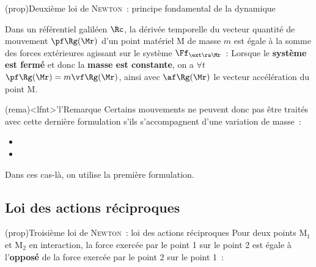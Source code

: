 \documentclass[../../main/main.tex]{subfiles}
\begin{document}
\begin{tcb*}(prop){Deuxième loi de \textsc{Newton}~: principe fondamental de la
			dynamique}

	Dans un référentiel galiléen $\Rc$, la dérivée temporelle du vecteur
	quantité de mouvement $\pf\Rg(\Mr)$ d'un point matériel M de masse $m$ est
	égale à la somme des forces extérieures agissant sur le système
	$\Ff_{\ext\ra\Mr}$~:
	\psw{
		\[
			\boxed{\dv{\pf\Rg(\Mr)}{t} = \sum \Ff_{\ext\ra\Mr}}
		\]
	}
	Lorsque le \textbf{système est fermé} et donc la \textbf{masse est constante},
	on a $\forall t$ $\pf\Rg(\Mr) = m\vf\Rg(\Mr)$, ainsi
	\psw{
		\[
			\boxed{m\af\Rg(\Mr) = \sum \Ff_{\ext\ra\Mr}}
		\]
	}
	avec $\af\Rg(\Mr)$ le vecteur accélération du point M.
\end{tcb*}

\begin{tcb*}(rema)<lfnt>'l'{Remarque}
	Certains mouvements ne peuvent donc pas être traités avec cette dernière
	formulation s'ils s'accompagnent d'une variation de masse~:
	\begin{itemize}
		\item {}
		\item {}
	\end{itemize}
	Dans ces cas-là, on utilise la première formulation.
\end{tcb*}

\subsection{Loi des actions réciproques}

\begin{tcb*}[sidebyside](prop){Troisième loi de \textsc{Newton}~:%
			loi des actions réciproques}
	Pour deux points M$_1$ et M$_2$ en interaction, la force exercée par le point
	1 sur le point 2 est égale à l'\textbf{opposé} de la force exercée par le
	point 2 sur le point 1~:
	\psw{
		\[\boxed{\Ff_{1\ra2} = - \Ff_{2\ra1}}\]
	}
	\tcblower
	\begin{minipage}{0.45\linewidth}
		\begin{center}
		\end{center}
	\end{minipage}
	\hfill
	\begin{minipage}{0.45\linewidth}
		\begin{center}
			\vspace{-15pt}
		\end{center}
	\end{minipage}
\end{tcb*}
\end{document}
